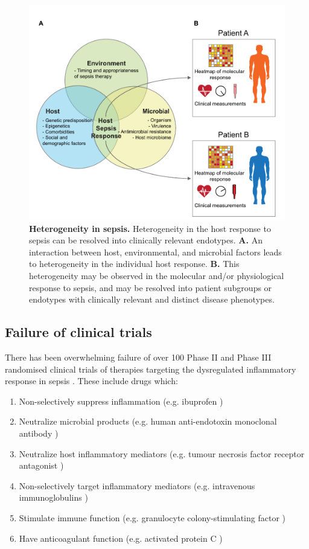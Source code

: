 \FloatBarrier
\begin{figure}[htbp]
\centering
\includegraphics[scale=0.8]{./Introduction/Images/heterogeneity.pdf}
\caption[Heterogeneity in sepsis]{\textbf{Heterogeneity in sepsis.} Heterogeneity in the host response to sepsis can be resolved into clinically relevant endotypes. \textbf{A.} An interaction between host, environmental, and microbial factors leads to heterogeneity in the individual host response. \textbf{B.} This heterogeneity may be observed in the molecular and/or physiological response to sepsis, and may be resolved into patient subgroups or endotypes with clinically relevant and distinct disease phenotypes.}
\label{fig:heterogeneity}
\end{figure}

\subsection{Failure of clinical trials}
There has been overwhelming failure of over 100 Phase II and Phase III randomised clinical trials of therapies targeting the dysregulated inflammatory response in sepsis \parencite{Marshall2014}. These include drugs which:
\begin{enumerate}
\item Non-selectively suppress inflammation (e.g. ibuprofen \parencite{Bernard1997})
\item Neutralize microbial products (e.g. human anti-endotoxin monoclonal antibody \parencite{McCloskey1994})
\item Neutralize host inflammatory mediators (e.g. tumour necrosis factor receptor antagonist \parencite{Cohen1996})
\item Non-selectively target inflammatory mediators (e.g. intravenous immunoglobulins \parencite{Werdan2007})
\item Stimulate immune function (e.g. granulocyte colony-stimulating factor \parencite{Marti-Carvajal2012})
\item Have anticoagulant function (e.g. activated protein C \parencite{Root2003})
\end{enumerate}

